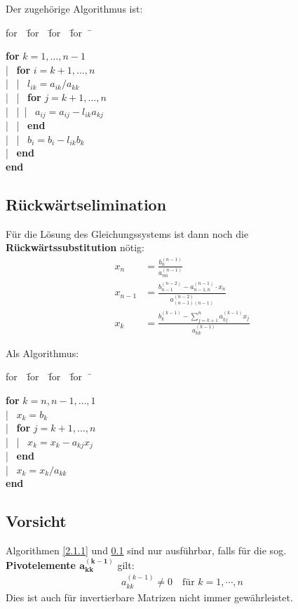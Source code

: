 \documentclass[ngerman,fontsize=11pt, paper=a4, parskip=half, titlepage=true, toc=bib]{scrbook}
\newenvironment{pseudocode}[1]{ %
  \begin{minipage}{#1}
    \begin{framed}
      \hspace*{1em}	
      \begin{minipage}{#1}
        \begin{tabbing}
          for~~\= for~~\= for~~\= for~~\= \kill
	}
	{ %
        \end{tabbing}
      \end{minipage}
      \hspace*{1em}
    \end{framed}
  \end{minipage}
}
\begin{document}
Der zugehörige Algorithmus ist:

\begin{pseudocode}{0.5\linewidth}
  \textbf{for} $ k = 1, \dots , n-1$\\
  |~	\> \textbf{for} $i = k + 1, \dots , n$ \\
  |~	\> |~\> $l_{ik} = a_{ik} /a_{kk}$\\
  |~	\> |~\> \textbf{for} $j = k + 1, \dots , n$ \\
  |~	\> |~\>|~\> $a_{ij} = a_{ij} - l_{ik} a_{kj} $\\
  |~	\> |~\> \textbf{end}\\
  |~	\> |~\> $b_i = b_i -  l_{ik} b_k $\\
  |~	\> \textbf{end} \\
  \textbf{end}
\end{pseudocode}

\subsection{Rückwärtselimination}\label{2.1.2}
Für die Lösung des Gleichungssystems ist dann noch die
 \textbf{Rückwärtssubstitution}  nötig:
\begin{align}
  x_n &= \frac{b_n^{(n-1)}}{a_{nn}^{(n-1)}} \label{II.1.5} \\
  x_{n-1} &=  \frac{b_{n-1}^{(n-2)}-a_{n-1,n}^{(n-1)}\cdot x_n}
  							 {a_{(n-1)(n-1)}^{(n-2)}} \label{II.1.6} \\
  x_k &= \frac{b_k^{(k-1)}-\sum_{j=k+1}^{n}a_{kj}^{(k-1)}x_j}
                     {a_{kk}^{(k-1)}} \label{II.1.7}
\end{align}

Als Algorithmus:

\begin{pseudocode}{0.5\linewidth}
  \textbf{for} $k = n, n -1, \dots , 1$ \\
  |~		\>$x_k = b_k$ \\
  |~		\>\textbf{for} $j = k + 1, \dots , n$ \\
  |~		\>|~	$x_k = x_k - a_{kj}x_j$ \\
  |~		\>\textbf{end} \\
  |~		\>$x_k = x_k /a_{kk}$ \\
  \textbf{end}
\end{pseudocode}

\subsection{Vorsicht}
Algorithmen \ref{2.1.1} und \ref{2.1.2} sind nur ausführbar,
 falls für die sog. \textbf{Pivotelemente $\mathbf{a_{kk}^{(k-1)}}$ }  gilt:
\begin{gather*}
  a_{kk}^{(k-1)} \neq 0 \quad   \text{für } k=1, \cdots , n
\end{gather*}
Dies ist auch für invertierbare Matrizen nicht immer gewährleistet.
\end{document}
